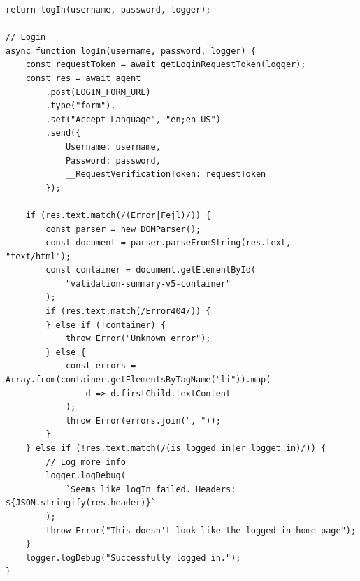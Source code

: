 \documentclass[jou,apacite]{apa6}
\begin{document}
\begin{lstlisting}[caption=Comparison 11b - Template connect against rejsekort.js's logIn Method]
	return logIn(username, password, logger);

// Login
async function logIn(username, password, logger) {
	const requestToken = await getLoginRequestToken(logger);
	const res = await agent
		.post(LOGIN_FORM_URL)
		.type("form").
		.set("Accept-Language", "en;en-US")
		.send({
			Username: username,
			Password: password,
			__RequestVerificationToken: requestToken
		});

	if (res.text.match(/(Error|Fejl)/)) {
		const parser = new DOMParser();
		const document = parser.parseFromString(res.text, "text/html");
		const container = document.getElementById(
			"validation-summary-v5-container"
		);
		if (res.text.match(/Error404/)) {
		} else if (!container) {
			throw Error("Unknown error");
		} else {
			const errors = Array.from(container.getElementsByTagName("li")).map(
				d => d.firstChild.textContent
			);
			throw Error(errors.join(", "));
		}
	} else if (!res.text.match(/(is logged in|er logget in)/)) {
		// Log more info
		logger.logDebug(
			`Seems like logIn failed. Headers: ${JSON.stringify(res.header)}`
		);
		throw Error("This doesn't look like the logged-in home page");
	}
	logger.logDebug("Successfully logged in.");
}
\end{lstlisting}
\end{document}
